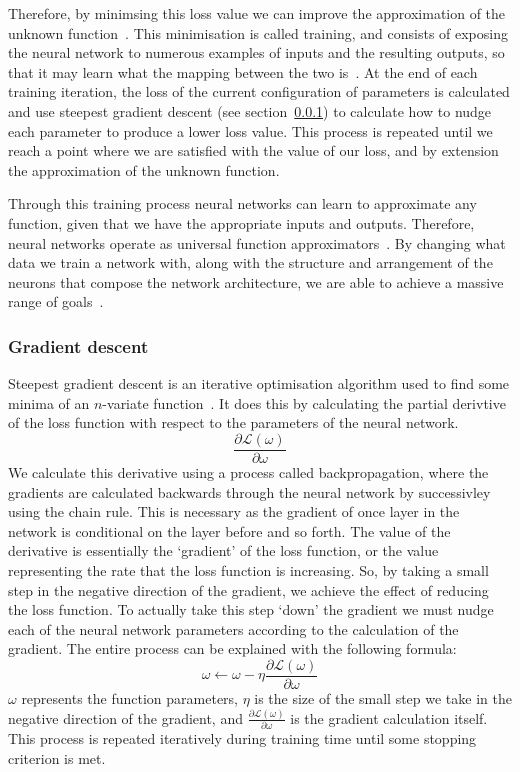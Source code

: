 Therefore, by minimsing this loss value we can improve the approximation of the unknown function~\cite{ref}. This minimisation is called training, and consists of exposing the neural network to numerous examples of inputs and the resulting outputs, so that it may learn what the mapping between the two is~\cite{ref}. At the end of each training iteration, the loss of the current configuration of parameters is calculated and use steepest gradient descent (see section~\ref{subsubsec:sgd}) to calculate how to nudge each parameter to produce a lower loss value. This process is repeated until we reach a point where we are satisfied with the value of our loss, and by extension the approximation of the unknown function.

Through this training process neural networks can learn to approximate any function, given that we have the appropriate inputs and outputs. Therefore, neural networks operate as universal function approximators~\cite{ref}. By changing what data we train a network with, along with the structure and arrangement of the neurons that compose the network architecture, we are able to achieve a massive range of goals~\cite{ref}.

\subsubsection{Gradient descent}\label{subsubsec:sgd}
Steepest gradient descent is an iterative optimisation algorithm used to find some minima of an $n$-variate function~\cite{ref}. It does this by calculating the partial derivtive of the loss function with respect to the parameters of the neural network.
\[\frac{\partial\mathcal{L}(\omega)}{\partial\omega}\]
We calculate this derivative using a process called backpropagation, where the gradients are calculated backwards through the neural network by successivley using the chain rule. This is necessary as the gradient of once layer in the network is conditional on the layer before and so forth. The value of the derivative is essentially the `gradient' of the loss function, or the value representing the rate that the loss function is increasing. So, by taking a small step in the negative direction of the gradient, we achieve the effect of reducing the loss function. To actually take this step `down' the gradient we must nudge each of the neural network parameters according to the calculation of the gradient. The entire process can be explained with the following formula:
\[\omega \leftarrow\omega - \eta\frac{\partial\mathcal{L}(\omega)}{\partial\omega}\]
$\omega$ represents the function parameters, $\eta$ is the size of the small step we take in the negative direction of the gradient, and $\frac{\partial\mathcal{L}(\omega)}{\partial\omega}$ is the gradient calculation itself. This process is repeated iteratively during training time until some stopping criterion is met.

